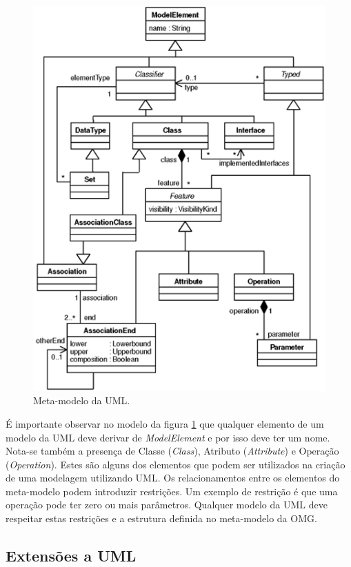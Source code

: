 \begin{figure}
	\centering
	\includegraphics{img/uml_meta_model.png}
	\caption{Meta-modelo da UML.}\label{fig:uml_meta_model}
\end{figure}

É importante observar no modelo da figura \ref{fig:uml_meta_model} que qualquer elemento de um modelo da UML deve derivar de \textit{ModelElement} e
por isso deve ter um nome. Nota-se também a presença de Classe (\textit{Class}), Atributo
(\textit{Attribute}) e Operação (\textit{Operation}). Estes são alguns dos
elementos que podem ser utilizados na criação de uma modelagem utilizando UML.
Os relacionamentos entre os elementos do meta-modelo podem introduzir
restrições. Um exemplo de restrição é que uma operação pode ter zero ou mais
parâmetros. Qualquer modelo da UML deve respeitar estas restrições e a estrutura
definida no meta-modelo da OMG.

\subsection{Extensões a UML}

